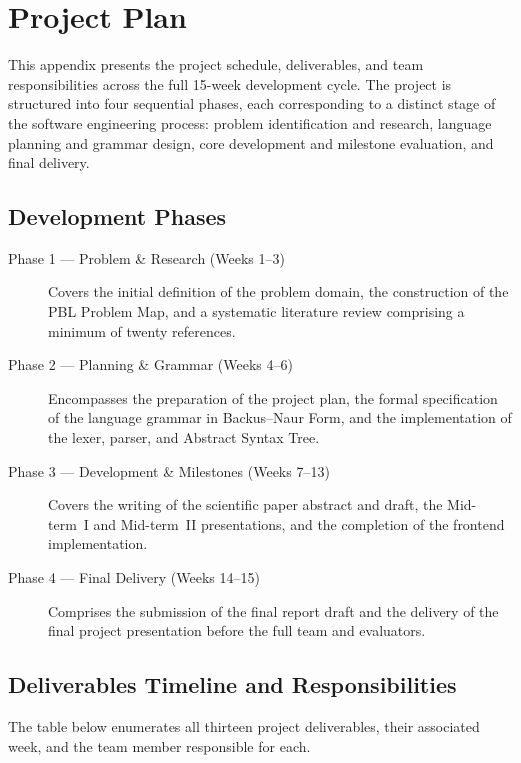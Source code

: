 \chapter{Project Plan}

This appendix presents the project schedule, deliverables, and team responsibilities
across the full 15-week development cycle. The project is structured into four
sequential phases, each corresponding to a distinct stage of the software
engineering process: problem identification and research, language planning and
grammar design, core development and milestone evaluation, and final delivery.

\section*{Development Phases}

\begin{description}
  \item[Phase 1 --- Problem \& Research (Weeks 1--3)]
    Covers the initial definition of the problem domain, the construction of the
    PBL Problem Map, and a systematic literature review comprising a minimum of
    twenty references.

  \item[Phase 2 --- Planning \& Grammar (Weeks 4--6)]
    Encompasses the preparation of the project plan, the formal specification of
    the language grammar in Backus--Naur Form, and the implementation of the
    lexer, parser, and Abstract Syntax Tree.

  \item[Phase 3 --- Development \& Milestones (Weeks 7--13)]
    Covers the writing of the scientific paper abstract and draft, the Mid-term~I
    and Mid-term~II presentations, and the completion of the frontend
    implementation.

  \item[Phase 4 --- Final Delivery (Weeks 14--15)]
    Comprises the submission of the final report draft and the delivery of the
    final project presentation before the full team and evaluators.
\end{description}

\section*{Deliverables Timeline and Responsibilities}

The table below enumerates all thirteen project deliverables, their associated
week, and the team member responsible for each.

